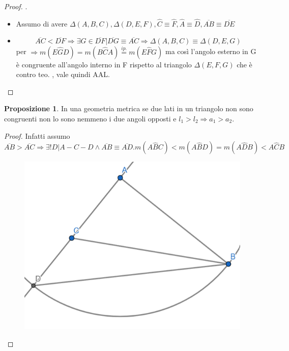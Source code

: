 \documentclass[a4paper,10pt]{article}
\theoremstyle{definition}
\theoremstyle{indentdefinition}
\theoremstyle{indentpostulate}
\theoremstyle{indenttheorem}
\newtheorem{prop}{Proposizione}[section]
\theoremstyle{myremark}
\theoremstyle{indentgeneral}
\begin{document}
\begin{proof}  .
\begin{itemize}
    \item Assumo di avere $\Delta (A,B,C), \Delta (D,E,F), \hat{C} \equiv \hat{F}, \hat{A} \equiv \hat{D}, \overline{AB} \equiv \overline{DE}$
    \item $$ \overline{AC}<\overline{DF} \Rightarrow \exists G \in \overline{DF}|\overline{DG} \equiv \overline{AC} \Rightarrow \Delta (A,B,C) \equiv  \Delta (D, E, G)$$ per  $\Rightarrow m(E\hat{G}D)=m(B\hat{C}A)\overset{ip.}{=}m(E\hat{F}G)$ ma così l'angolo esterno in G è congruente all'angolo interno in F rispetto al triangolo $\Delta (E,F,G)$ che è contro teo. , vale quindi AAL. 
\end{itemize}  \end{proof} 

\begin{prop}
    In una geometria metrica se due lati in un triangolo non sono congruenti non lo sono nemmeno i due angoli opposti e $l_1>l_2 \Rightarrow a_1>a_2$.
\end{prop}
\begin{proof}
 Infatti assumo $\overline{AB} > \overline{AC} \Rightarrow \exists ! D|A-C-D \land \overline{AB} \equiv \overline{AD}. m(A\hat{B}C)<m(A\hat{B}D)=m(A\hat{D}B)<A\hat{C}B$

\begin{figure}[H]
    \centering
    \includegraphics[scale=0.5]{Triangoli1.png}
\end{figure}
\end{proof}
\end{document}
